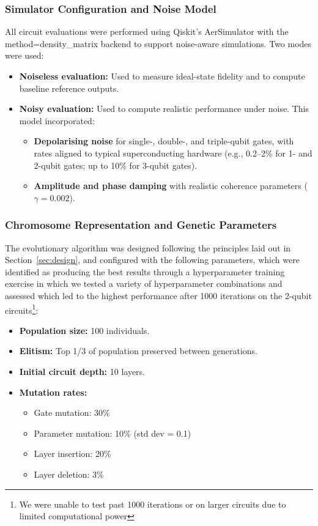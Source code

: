 \documentclass[11pt,a4paper]{article}
\begin{document}
\subsubsection*{Simulator Configuration and Noise Model}
All circuit evaluations were performed using Qiskit's AerSimulator with the method=density\_matrix backend to support noise-aware simulations. Two modes were used:

\begin{itemize}
    \item \textbf{Noiseless evaluation:} Used to measure ideal-state fidelity and to compute baseline reference outputs.
    \item \textbf{Noisy evaluation:} Used to compute realistic performance under noise. This model incorporated:
    \begin{itemize}
        \item \textbf{Depolarising noise} for single-, double-, and triple-qubit gates, with rates aligned to typical superconducting hardware (e.g., 0.2--2\% for 1- and 2-qubit gates; up to 10\% for 3-qubit gates).
        \item \textbf{Amplitude and phase damping} with realistic coherence parameters ($\gamma = 0.002$).
    \end{itemize}
\end{itemize}

\subsubsection*{Chromosome Representation and Genetic Parameters}
The evolutionary algorithm was designed following the principles laid out in Section~\ref{sec:design}, and configured with the following parameters, which were identified as producing the best results through a hyperparameter training exercise in which we tested a variety of hyperparameter combinations and assessed which led to the highest performance after 1000 iterations on the 2-qubit circuits\footnote{We were unable to test past 1000 iterations or on larger circuits due to limited computational power}:

\begin{itemize}
    \item \textbf{Population size:} 100 individuals.
    \item \textbf{Elitism:} Top 1/3 of population preserved between generations.
    \item \textbf{Initial circuit depth:} 10 layers.
    \item \textbf{Mutation rates:}
    \begin{itemize}
        \item Gate mutation: 30\%
        \item Parameter mutation: 10\% (std dev = 0.1)
        \item Layer insertion: 20\%
        \item Layer deletion: 3\%
    \end{itemize}
\end{itemize}
\end{document}

